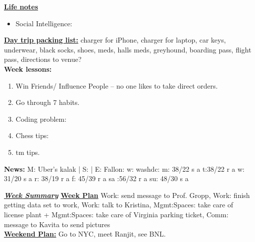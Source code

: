       \underline{\bf Life notes}
        \begin{itemize}
          \tiny \item \tiny Social Intelligence: 
        \end{itemize}

      
      {\underline{\bf Day trip packing list:} charger for iPhone,
        charger for laptop, car keys, underwear, black socks, shoes,
        meds, halls meds, greyhound, boarding pass, flight pass, directions to
        venue?} \\ 
      {\tiny {\bf Week lessons:}} \\ 
      \begin{enumerate}
        \tiny \item \tiny Win Friends/ Influence People – no one
        likes to take direct orders.
      \item \tiny Go through 7 habits.
      \item \tiny Coding problem: 
      \item \tiny Chess tips: 
      \item \tiny tm tips.
      \end{enumerate}
          {{\tiny {\bf News:}} M: Uber's kalak  | S:    | E: Fallon: 
            w: washdc: 
            {m: {38/22 s a}}  
            {t:{38/22 r a}} 
            {w: {31/20 s a}} 
            {r: {38/19 r a}} 
            {f: {45/39 r a}} 
            {sa :{56/32 r a} }
            {su: {48/30 s a  }}}    

\newpage 
  
   \underline{\bf \it Week Summary} 
      {\underline{\bf Week Plan}  Work: send message to Prof. Gropp, Work: finish getting data set to work,
        Work: talk to Kristina, Mgmt:Spaces: take care of license
        plant + Mgmt:Spaces: take care of Virginia parking ticket,
        Comm: message to Kavita to send pictures}\\ 
      {\underline{\bf Weekend Plan:} Go to NYC, meet Ranjit, see
        BNL.}\\
      


